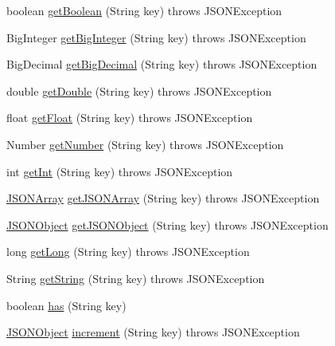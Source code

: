 \begin{DoxyCompactItemize}
\item 
boolean \hyperlink{classorg_1_1json_1_1JSONObject_ab40aab8de47233591ac4ad9d1b31adc0}{get\-Boolean} (String key)  throws J\-S\-O\-N\-Exception 
\item 
Big\-Integer \hyperlink{classorg_1_1json_1_1JSONObject_aa236e8c9ea6f66d366f962536f5b58b6}{get\-Big\-Integer} (String key)  throws J\-S\-O\-N\-Exception 
\item 
Big\-Decimal \hyperlink{classorg_1_1json_1_1JSONObject_aa4a743f61e251547b1edb81a6b8150f4}{get\-Big\-Decimal} (String key)  throws J\-S\-O\-N\-Exception 
\item 
double \hyperlink{classorg_1_1json_1_1JSONObject_abeec5fe03f3a260b7ec7a2b3076ca5ec}{get\-Double} (String key)  throws J\-S\-O\-N\-Exception 
\item 
float \hyperlink{classorg_1_1json_1_1JSONObject_a79ebc458b6a9617d0e3f5e606ef085d7}{get\-Float} (String key)  throws J\-S\-O\-N\-Exception 
\item 
Number \hyperlink{classorg_1_1json_1_1JSONObject_adb035aa00f7b0e60fcedc5a9268e47d2}{get\-Number} (String key)  throws J\-S\-O\-N\-Exception 
\item 
int \hyperlink{classorg_1_1json_1_1JSONObject_a3756c60c7c7bfecbdde3c3b5b1bcf385}{get\-Int} (String key)  throws J\-S\-O\-N\-Exception 
\item 
\hyperlink{classorg_1_1json_1_1JSONArray}{J\-S\-O\-N\-Array} \hyperlink{classorg_1_1json_1_1JSONObject_a884ee44fe958e9ea737d6c5e1180cb62}{get\-J\-S\-O\-N\-Array} (String key)  throws J\-S\-O\-N\-Exception 
\item 
\hyperlink{classorg_1_1json_1_1JSONObject}{J\-S\-O\-N\-Object} \hyperlink{classorg_1_1json_1_1JSONObject_a6011679cb15a3aac5944bb4a8af9f7fb}{get\-J\-S\-O\-N\-Object} (String key)  throws J\-S\-O\-N\-Exception 
\item 
long \hyperlink{classorg_1_1json_1_1JSONObject_a3547552ed2f4c5d415eab8202e8d6158}{get\-Long} (String key)  throws J\-S\-O\-N\-Exception 
\item 
String \hyperlink{classorg_1_1json_1_1JSONObject_a7140df2bac96f4d75a3f338ed16d1212}{get\-String} (String key)  throws J\-S\-O\-N\-Exception 
\item 
boolean \hyperlink{classorg_1_1json_1_1JSONObject_aa3d594c3e7a5b6d9b89aa6cda03bac28}{has} (String key)
\item 
\hyperlink{classorg_1_1json_1_1JSONObject}{J\-S\-O\-N\-Object} \hyperlink{classorg_1_1json_1_1JSONObject_a4c808cfee4389ecf543781feaa1b950c}{increment} (String key)  throws J\-S\-O\-N\-Exception 

\end{DoxyCompactItemize}
